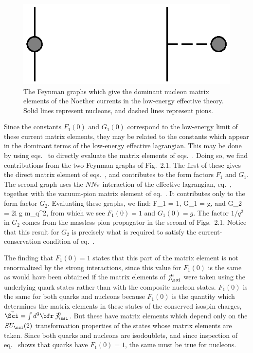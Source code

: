 \documentclass[12pt,epsf]{report}
\begin{document}
\begin{figure}
\includegraphics{NME.eps}
\caption{The Feynman graphs which give the dominant nucleon
matrix elements of the Noether currents in the low-energy
effective theory. Solid lines represent nucleons, and
dashed lines represent pions.}
\end{figure}


Since the constants $F_1(0)$ and $G_1(0)$ correspond to the
low-energy limit of these current matrix elements, they may
be related to the constants which appear in the dominant
terms of the low-energy effective lagrangian. This may be
done by using 
eqs.~ to directly evaluate the matrix
elements of eqs.~. Doing so, we
find contributions from the two Feynman graphs of Fig.~2.1.
The first of these gives the direct matrix element of
eqs.~, and contributes to the form
factors $F_1$ and $G_1$. The second graph uses the $NN\pi$
interaction of the effective lagrangian,
eq.~, together with the vacuum-pion
matrix element of eq.~. It
contributes only to the form factor $G_2$. Evaluating these
graphs, we find:
%
\eq
\label{formfactorpredictions}
F_1 = 1, \qquad G_1 = g, \qquad \hbox{and} 
\qquad G_2 = {2i g  m_\ssn \over q^2},
\eeq
%
from which we see $F_1(0) = 1$ and $G_1(0) = g$. The factor
$1/q^2$ in $G_2$ comes from the massless pion propagator in
the second of Figs.~2.1. Notice that this result for $G_2$
is precisely what is required to satisfy the
current-conservation condition of
eq.~.

The finding that $F_1(0) = 1$ states that this part of the
matrix element is not renormalized by the strong
interactions, since this value for $F_1(0)$ is the same as
would have been obtained if the matrix elements of
$\vec\jmath^\mu_\ssi$ were taken using the underlying quark
states rather than with the composite nucleon states.
$F_1(0)$ is the same for both quarks and nucleons because
$F_1(0)$ is the quantity which determines the matrix
elements in these states of the conserved isospin charges,
$\vec \Sci = \int 
d^3\bfr \; \vec\jmath^0_\ssi$. But these have matrix
elements which depend only on the $SU_\ssi(2)$
transformation properties of the states whose matrix
elements are taken. Since both quarks and nucleons are
isodoublets, and since inspection of 
eq.~ shows that quarks have $F_1(0) =
1$, the same must be true for nucleons.
\end{document}
